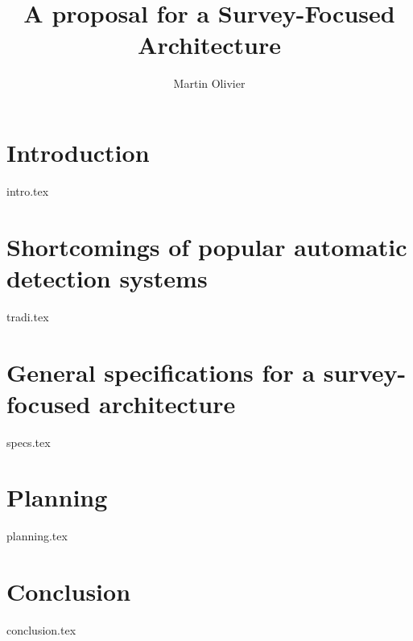\documentclass[a4paper, 12pt, titlepage, oneside, french]{article}
\author{Martin Olivier}
\title{A proposal for a Survey-Focused Architecture}
\begin{document}
\maketitle

\tableofcontents
\newpage

\section{Introduction}
{intro.tex}
\newpage

\section{Shortcomings of popular automatic detection systems}
{tradi.tex}
\newpage

\section{General specifications for a survey-focused architecture}
{specs.tex}
\newpage

\section{Planning}
{planning.tex}
\newpage

\section{Conclusion}
{conclusion.tex}
\newpage

\printbibliography[heading=bibintoc]
\end{document}
